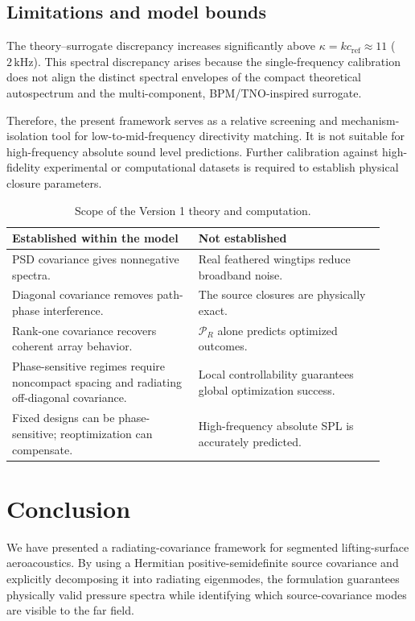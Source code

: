 \documentclass[11pt]{article}
\begin{document}
\subsection{Limitations and model bounds}

The theory--surrogate discrepancy increases significantly above $\kappa = kc_{\mathrm{ref}} \approx 11$ ($2\,\mathrm{kHz}$). This spectral discrepancy arises because the single-frequency calibration does not align the distinct spectral envelopes of the compact theoretical autospectrum and the multi-component, BPM/TNO-inspired surrogate.

Therefore, the present framework serves as a relative screening and mechanism-isolation tool for low-to-mid-frequency directivity matching. It is not suitable for high-frequency absolute sound level predictions. Further calibration against high-fidelity experimental or computational datasets is required to establish physical closure parameters.

\begin{table}[htbp]
\centering
\caption{Scope of the Version 1 theory and computation.}
\label{tab:scope_bounds}
\begin{tabular}{p{0.46\linewidth}p{0.46\linewidth}}
\toprule
\textbf{Established within the model} & \textbf{Not established} \\
\midrule
PSD covariance gives nonnegative spectra. & Real feathered wingtips reduce broadband noise. \\
Diagonal covariance removes path-phase interference. & The source closures are physically exact. \\
Rank-one covariance recovers coherent array behavior. & $\mathcal P_R$ alone predicts optimized outcomes. \\
Phase-sensitive regimes require noncompact spacing and radiating off-diagonal covariance. & Local controllability guarantees global optimization success. \\
Fixed designs can be phase-sensitive; reoptimization can compensate. & High-frequency absolute SPL is accurately predicted. \\
\bottomrule
\end{tabular}
\end{table}

\section{Conclusion}

We have presented a radiating-covariance framework for segmented lifting-surface aeroacoustics. By using a Hermitian positive-semidefinite source covariance and explicitly decomposing it into radiating eigenmodes, the formulation guarantees physically valid pressure spectra while identifying which source-covariance modes are visible to the far field.
\end{document}
